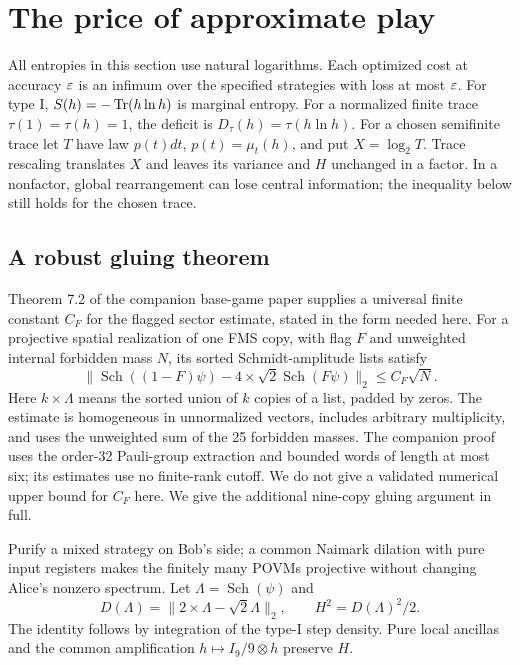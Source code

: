 \section{The price of approximate play}\label{sec:prices}
All entropies in this section use natural logarithms. Each optimized cost at accuracy $\varepsilon$ is an infimum over the specified strategies with loss at most $\varepsilon$. For type I, $S(h)=-\operatorname{Tr}(h\ln h)$ is marginal entropy. For a normalized finite trace $\tau(1)=\tau(h)=1$, the deficit is $D_\tau(h)=\tau(h\ln h)$. For a chosen semifinite trace let $T$ have law $p(t)dt$, $p(t)=\mu_t(h)$, and put $X=\log_2T$. Trace rescaling translates $X$ and leaves its variance and $H$ unchanged in a factor. In a nonfactor, global rearrangement can lose central information; the inequality below still holds for the chosen trace.

\subsection{A robust gluing theorem}
Theorem 7.2 of the companion base-game paper \cite{Base} supplies a universal finite constant $C_F$ for the flagged sector estimate, stated in the form needed here. For a projective spatial realization of one FMS copy, with flag $F$ and unweighted internal forbidden mass $N$, its sorted Schmidt-amplitude lists satisfy
\begin{equation}\label{eq:sector}
 \bigl\|\operatorname{Sch}((1-F)\psi)
       -4\mathbin{\times}\sqrt2\operatorname{Sch}(F\psi)\bigr\|_2
 \le C_F\sqrt N.
\end{equation}
Here $k\mathbin{\times}\Lambda$ means the sorted union of $k$ copies of a list, padded by zeros. The estimate is homogeneous in unnormalized vectors, includes arbitrary multiplicity, and uses the unweighted sum of the 25 forbidden masses. The companion proof uses the order-32 Pauli-group extraction and bounded words of length at most six; its estimates use no finite-rank cutoff. We do not give a validated numerical upper bound for $C_F$ here. We give the additional nine-copy gluing argument in full.

Purify a mixed strategy on Bob's side; a common Naimark dilation with pure input registers makes the finitely many POVMs projective without changing Alice's nonzero spectrum. Let $\Lambda=\operatorname{Sch}(\psi)$ and
\[
 D(\Lambda)=\|2\mathbin{\times}\Lambda-\sqrt2\Lambda\|_2,
 \qquad H^2=D(\Lambda)^2/2.
\]
The identity follows by integration of the type-I step density. Pure local ancillas and the common amplification $h\mapsto I_9/9\otimes h$ preserve $H$.

